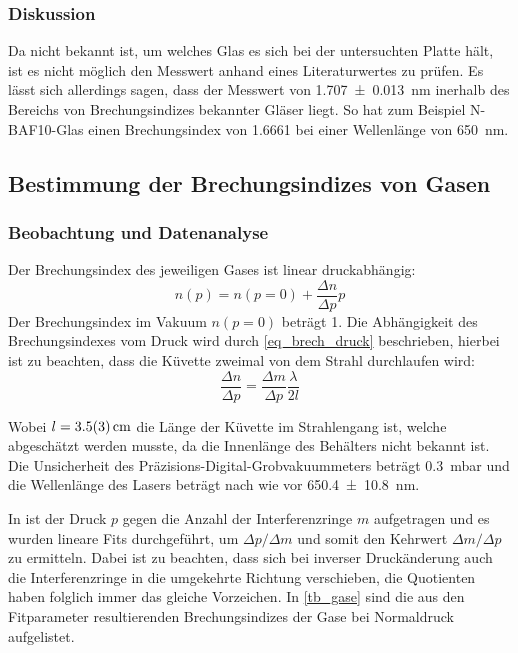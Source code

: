 \documentclass[
	a4paper,
	12pt,
	pagesize,
	ngerman
]{scrartcl}
\begin{document}
	\subsubsection{Diskussion}
	Da nicht bekannt ist, um welches Glas es sich bei der untersuchten Platte hält, ist es nicht möglich den Messwert anhand eines Literaturwertes zu prüfen.
	Es lässt sich allerdings sagen, dass der Messwert von \SI{1.707+-0.013}{nm} inerhalb des Bereichs von Brechungsindizes bekannter Gläser liegt.
	So hat zum Beispiel N-BAF10-Glas einen Brechungsindex von \SI{1,6661}{} bei einer Wellenlänge von \SI{650}{nm}.\cite{Brechungsindizes}

	\subsection{Bestimmung der Brechungsindizes von Gasen}
	\subsubsection{Beobachtung und Datenanalyse}
	Der Brechungsindex des jeweiligen Gases ist linear druckabhängig:
	\begin{equation}
		n(p) = n(p=0) + \frac{\Delta n}{\Delta p}p
		\label{eq_brech_p}
	\end{equation}
	Der Brechungsindex im Vakuum $n(p=0)$ beträgt 1.
	Die Abhängigkeit des Brechungsindexes vom Druck wird durch \cref{eq_brech_druck} beschrieben, hierbei ist zu beachten, dass die Küvette zweimal von dem Strahl durchlaufen wird:
	\begin{equation}
			\frac{\Delta n}{\Delta p} = \frac{\Delta m}{\Delta p} \frac{\lambda}{2l}
	\end{equation}

	Wobei $l=\SI{3.5+-0.3}{cm}$ die Länge der Küvette im Strahlengang ist, welche abgeschätzt werden musste, da die Innenlänge des Behälters nicht bekannt ist.
	Die Unsicherheit des Präzisions-Digital-Grobvakuummeters beträgt \SI{0.3}{mbar} und die Wellenlänge des Lasers beträgt nach wie vor \SI{650.4+-10.8}{nm}.

	In  ist der Druck $p$ gegen die Anzahl der Interferenzringe $m$ aufgetragen und es wurden lineare Fits durchgeführt, um $\Delta p / \Delta m$ und somit den Kehrwert $\Delta m / \Delta p$ zu ermitteln.
	Dabei ist zu beachten, dass sich bei inverser Druckänderung auch die Interferenzringe in die umgekehrte Richtung verschieben, die Quotienten haben folglich immer das gleiche Vorzeichen.
	In \cref{tb_gase} sind die aus den Fitparameter resultierenden Brechungsindizes der Gase bei Normaldruck aufgelistet.
\end{document}
